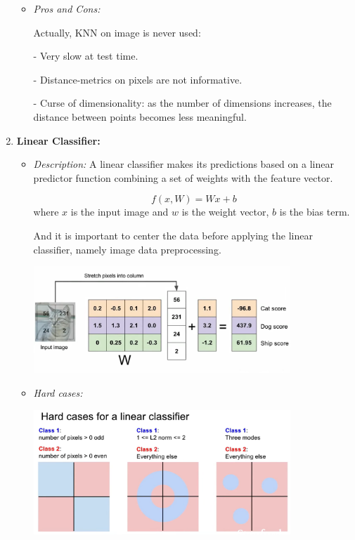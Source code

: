 \documentclass{article}
\numberwithin{equation}{section}
\begin{document}
\begin{CJK}{UTF8}{gbsn}
\begin{enumerate}
\begin{itemize}
            \item \textit{Pros and Cons:}\par
            Actually, KNN on image is never used:\par
            - Very slow at test time.\par
            - Distance-metrics on pixels are not informative.\par
            - Curse of dimensionality: as the number of dimensions increases, the distance between points becomes less meaningful.\par
        \end{itemize}

        \item \textbf{Linear Classifier:}
        \begin{itemize}
            \item \textit{Description:} A linear classifier makes its predictions based on a linear predictor function combining a set of weights with the feature vector.\par
            \begin{equation}
                f(x, W) = Wx + b
            \end{equation}
            where \(x\) is the input image and \(w\) is the weight vector, \(b\) is the bias term.\par
            And it is important to center the data before applying the linear classifier, namely image data preprocessing.\par
            \includegraphics[width=0.8\textwidth]{images/Lecture2/linear_classifier_example.png}
            \item \textit{Hard cases:}\par
            \includegraphics[width=0.8\textwidth]{images/Lecture2/hard_cases_for_linear_classifier.png}
        \end{itemize}
    \end{enumerate}




\end{CJK}
\end{document}
